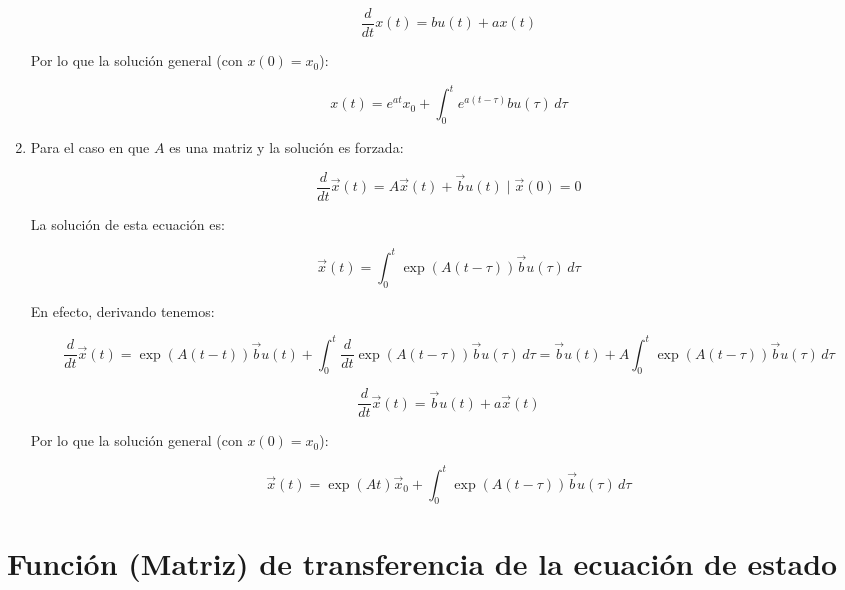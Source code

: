 \begin{enumerate}
        \begin{equation}
            \frac{d}{dt} x(t) = b u(t) + a x(t)
        \end{equation}

        Por lo que la solución general (con $x(0) = x_0$):

        \begin{equation}
            x(t) = e^{at} x_0 + \int_0^t e^{a(t-\tau)} b u(\tau) \, d \tau
        \end{equation}

    \item Para el caso en que $A$ es una matriz y la solución es forzada:

        \begin{equation}
            \frac{d}{dt} \vec{x}(t) = A \vec{x}(t) + \vec{b} u(t) \mid \vec{x}(0) = 0
        \end{equation}

        La solución de esta ecuación es:

        \begin{equation}
            \vec{x}(t) = \int_0^t \exp{(A(t-\tau))} \vec{b} u(\tau) \, d \tau
        \end{equation}

        En efecto, derivando tenemos:

        \begin{equation*}
            \frac{d}{dt} \vec{x}(t) = \exp{(A(t-t))} \vec{b} u(t) + \int_0^t \frac{d}{dt} \exp{(A(t-\tau))} \vec{b} u(\tau) \, d \tau = \vec{b} u(t) + A \int_0^t \exp{(A(t-\tau))} \vec{b} u(\tau) \, d \tau
        \end{equation*}

        \begin{equation}
            \frac{d}{dt} \vec{x}(t) = \vec{b} u(t) + a \vec{x}(t)
        \end{equation}

        Por lo que la solución general (con $x(0) = x_0$):

        \begin{equation}
            \vec{x}(t) = \exp{(At)} \vec{x}_0 + \int_0^t \exp{(A(t-\tau))} \vec{b} u(\tau) \, d \tau
        \end{equation}

    \end{enumerate}

    \section{Función (Matriz) de transferencia de la ecuación de estado}

